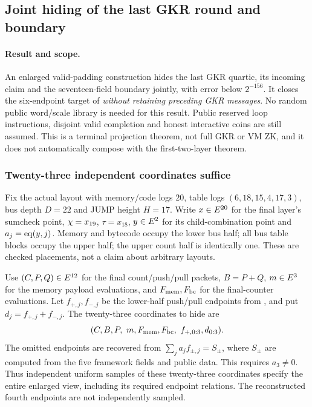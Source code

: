 \subsection{Joint hiding of the last GKR round and boundary}\label{note:zk-terminal-boundary}

\paragraph{Result and scope.} An enlarged valid-padding construction hides the last GKR quartic, its incoming claim and the seventeen-field boundary jointly, with error below $2^{-156}$. It closes the six-endpoint target of  \emph{without retaining preceding GKR messages}. No random public word/scale library is needed for this result. Public reserved loop instructions, disjoint valid completion and honest interactive coins are still assumed. This is a terminal projection theorem, not full GKR or VM ZK, and it does not automatically compose with the first-two-layer theorem.

\subsubsection{Twenty-three independent coordinates suffice}

Fix the actual layout with memory/code logs $20$, table logs $(6,18,15,4,17,3)$, bus depth $D=22$ and JUMP height $H=17$. Write $x\in E^{20}$ for the final layer's sumcheck point, $\chi=x_{19}$, $\tau=x_{18}$, $y\in E^2$ for its child-combination point and $a_j=\operatorname{eq}(y,j)$. Memory and bytecode occupy the lower bus half; all bus table blocks occupy the upper half; the upper count half is identically one. These are checked placements, not a claim about arbitrary layouts.

Use $(C,P,Q)\in E^{12}$ for the final count/push/pull packets, $B=P+Q$, $m\in E^3$ for the memory payload evaluations, and $F_{\rm mem},F_{\rm bc}$ for the final-counter evaluations. Let $f_{+,j},f_{-,j}$ be the lower-half push/pull endpoints from , and put $d_j=f_{+,j}+f_{-,j}$. The twenty-three coordinates to hide are
\[
 (C,B,P,\ m,F_{\rm mem},F_{\rm bc},\ f_{+,0:3},d_{0:3}).
\]
The omitted endpoints are recovered from $\sum_j a_j f_{\pm,j}=S_\pm$, where $S_\pm$ are computed from the five framework fields and public data. This requires $a_3\ne0$. Thus independent uniform samples of these twenty-three coordinates specify the entire enlarged view, including its required endpoint relations. The reconstructed fourth endpoints are not independently sampled.

